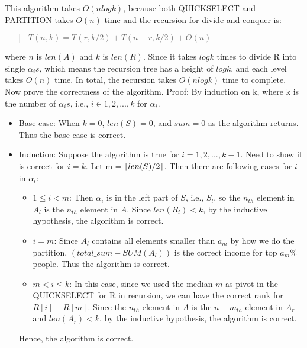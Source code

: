 \documentclass[11pt]{article}
\begin{document}
\begin{solution}
\begin{enumerate}[(a)]
    
    This algorithm takes $O(nlogk)$, because both QUICKSELECT and PARTITION takes $O(n)$ time and the recursion for divide and conquer is:
    \begin{quote}
    $T(n, k) = T(r, k/2) + T(n-r, k/2) + O(n)$
    \end{quote}
    where $n$ is $len(A)$ and $k$ is $len(R)$. Since it takes $logk$ times to divide R into single $\alpha_is$, which means the recursion tree has a height of $logk$, and each level takes $O(n)$ time. In total, the recursion takes $O(nlogk)$ time to complete.
    \newline
    \newline
    Now prove the correctness of the algorithm.
    \newline
    \newline
    Proof: By induction on k, where k is the number of $\alpha_is$, i.e., $i\in{1,2,...,k}$ for $\alpha_i$.
    \begin{itemize}
        \item Base case: When $k = 0$, $len(S) = 0$, and $sum = 0$ as the algorithm returns. Thus the base case is correct.
        \item Induction: Suppose the algorithm is true for $i = 1, 2, ..., k-1$. Need to show it is correct for $i = k$. Let m =  $\lceil len(S)/2 \rceil$. Then there are following cases for $i$ in $\alpha_i$:
        \begin{itemize}
            \item $1\leq i < m$: Then $\alpha_i$ is in the left part of $S$, i.e., $S_l$, so the $n_{th}$ element in $A_l$ is the $n_{th}$ element in $A$. Since $len(R_l) < k$, by the inductive hypothesis, the algorithm is correct.
            \item $i = m$: Since $A_l$ contains all elements smaller than $a_m$ by how we do the partition, $(total\_sum - SUM(A_l))$ is the correct income for top $a_m\%$ people. Thus the algorithm is correct.
            \item $m < i\leq k$: In this case, since we used the median $m$ as pivot in the QUICKSELECT for R in recursion, we can have the correct rank for $R[i] - R[m]$. Since the $n_{th}$ element in $A$ is the $n-m_{th}$ element in $A_r$ and $len(A_r) < k$, by the inductive hypothesis, the algorithm is correct.
        \end{itemize}
        Hence, the algorithm is correct.
    \end{itemize}
\end{enumerate}

\end{solution}
\end{document}
